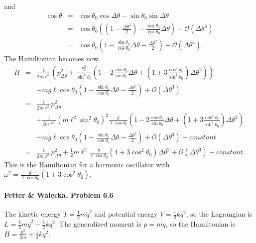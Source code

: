 \documentclass[letterpaper,11pt]{article}
\begin{document}
and
\begin{eqnarray*}
 \cos\theta & = & \cos\theta_0\cos\Delta\theta - \sin\theta_0\sin\Delta\theta \\
 & = & \cos\theta_0 \left( \left(1 - \frac{\Delta\theta^2}{2} \right) - \frac{\sin\theta_0}{\cos\theta_0} \Delta\theta \right) + \mathcal{O}(\Delta\theta^3) \\
 & = & \cos\theta_0 \left( 1 - \frac{\sin\theta_0}{\cos\theta_0} \Delta\theta - \frac{\Delta\theta^2}{2} \right) + \mathcal{O}(\Delta\theta^3).
\end{eqnarray*}
The Hamiltonian becomes now
\begin{eqnarray*}
 H & = & \frac{1}{2m\ell^2} \left( p_{\Delta\theta}^2 + \frac{p_\phi^2}{\sin^2\theta_0} \left( 1 - 2 \frac{\cos\theta_0}{\sin\theta_0} \Delta\theta + \left(1 + 3 \frac{\cos^2\theta_0}{\sin^2\theta_0} \right) \Delta\theta^2 \right) \right) \\
 & & - mg\ell\cos\theta_0 \left( 1 - \frac{\sin\theta_0}{\cos\theta_0} \Delta\theta - \frac{\Delta\theta^2}{2} \right) + \mathcal{O}(\Delta\theta^3) \\
 & = & \frac{1}{2m\ell^2} p_{\Delta\theta}^2 \\
 & & + \frac{1}{2m\ell^2} \left(m\ell^2\sin^2\theta_0\right)^2 \frac{g}{\ell\cos\theta_0} \left( 1 - 2 \frac{\cos\theta_0}{\sin\theta_0} \Delta\theta + \left(1 + 3 \frac{\cos^2\theta_0}{\sin^2\theta_0} \right) \Delta\theta^2 \right) \\
 & & - mg\ell\cos\theta_0 \left( 1 - \frac{\sin\theta_0}{\cos\theta_0} \Delta\theta - \frac{\Delta\theta^2}{2} \right) + \mathcal{O}(\Delta\theta^3) + constant \\
 & = & \frac{1}{2m\ell^2} p_{\Delta\theta}^2 + \frac{1}{2} m\ell^2 \frac{g}{\ell\cos\theta_0} \left( 1 + 3 \cos^2\theta_0 \right) \Delta\theta^2 + \mathcal{O}(\Delta\theta^3) + constant.
\end{eqnarray*}
This is the Hamiltonian for a harmonic oscillator with $\omega^2 = \frac{g}{\ell\cos\theta_0} \left( 1 + 3 \cos^2\theta_0 \right)$.

\paragraph{Fetter \& Walecka, Problem 6.6}
The kinetic energy $T = \frac{1}{2} m \dot{q}^2$ and potential energy $V = \frac{1}{2} k q^2$, so the Lagrangian is $L = \frac{1}{2} m \dot{q}^2 - \frac{1}{2} k q^2$.  The generalized moment is $p = m \dot{q}$, so the Hamiltonian is $H = \frac{p^2}{2m} + \frac{1}{2} k q^2$.
\end{document}

